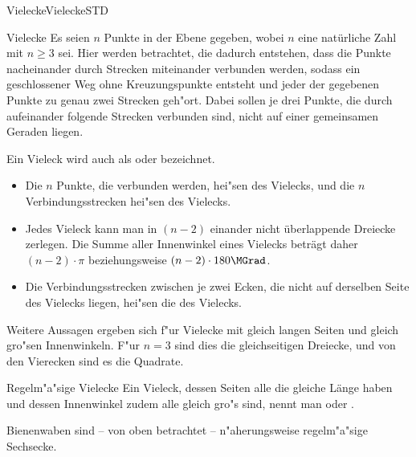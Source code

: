 \begin{MXContent}{Vielecke}{Vielecke}{STD}

\begin{MXInfo}{Vielecke}%
Es seien $n$ Punkte in der Ebene gegeben, wobei $n$ eine nat\"urliche Zahl mit 
$n \geq 3$ sei.
Hier werden  betrachtet, die dadurch entstehen, dass
die Punkte nacheinander durch Strecken miteinander verbunden werden, sodass 
ein geschlossener Weg ohne Kreuzungspunkte entsteht und jeder der gegebenen 
Punkte zu genau zwei Strecken geh"ort. 
Dabei sollen je drei Punkte, die durch aufeinander folgende Strecken verbunden
sind, nicht auf einer gemeinsamen Geraden liegen.

Ein Vieleck wird auch als  oder 
 bezeichnet.

\begin{itemize}
\item Die $n$ Punkte, die verbunden werden, hei"sen 
  des Vielecks, und
 die $n$ Verbindungsstrecken hei"sen
  des Vielecks.

\item Jedes Vieleck kann man in $(n-2)$ einander nicht \"uberlappende 
 Dreiecke zerlegen. Die Summe aller Innenwinkel eines Vielecks betr\"agt daher 
 $(n-2) \cdot \pi$ beziehungsweise $(n-2) \cdot 180\MGrad$.

\item Die Verbindungsstrecken zwischen je zwei Ecken, die nicht auf derselben 
 Seite des Vielecks liegen, hei"sen die  
 des Vielecks.
\end{itemize}
\end{MXInfo}

Weitere Aussagen ergeben sich f"ur Vielecke mit gleich langen Seiten und 
gleich gro"sen Innenwinkeln. F"ur $n = 3$ sind dies die gleichseitigen 
Dreiecke, und von den Vierecken sind es die Quadrate.

\begin{MXInfo}{Regelm"a"sige Vielecke}
Ein Vieleck, dessen Seiten alle die gleiche L\"ange haben und dessen 
Innenwinkel zudem alle gleich gro"s sind, nennt man
oder .
\end{MXInfo}
Bienenwaben sind -- von oben betrachtet -- n"aherungsweise regelm"a"sige 
Sechsecke.


\end{MXContent}
